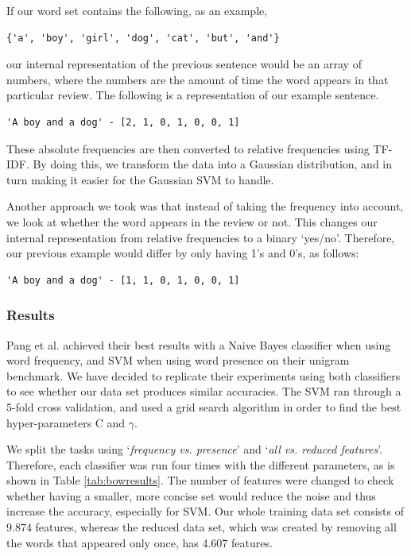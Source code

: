 \documentclass{article}
\begin{document}
If our word set contains the following, as an example,
\begin{lstlisting}
{'a', 'boy', 'girl', 'dog', 'cat', 'but', 'and'}
\end{lstlisting}

our internal representation of the previous sentence would be an array of numbers, where the numbers are the amount of time the word appears in that particular review. The following is a representation of our example sentence.

\begin{lstlisting}
'A boy and a dog' - [2, 1, 0, 1, 0, 0, 1]
\end{lstlisting}

These absolute frequencies are then converted to relative frequencies using TF-IDF. By doing this, we transform the data into a Gaussian distribution, and in turn making it easier for the Gaussian SVM to handle. 

Another approach we took was that instead of taking the frequency into account, we look at whether the word appears in the review or not. This changes our internal representation from relative frequencies to a binary `yes/no'. Therefore, our previous example would differ by only having 1's and 0's, as follows:

\begin{lstlisting}
'A boy and a dog' - [1, 1, 0, 1, 0, 0, 1]
\end{lstlisting}

\subsubsection{Results}
Pang et al. \cite{pangetal} achieved their best results with a Naive Bayes classifier when using word frequency, and SVM when using word presence on their unigram benchmark. We have decided to replicate their experiments using both classifiers to see whether our data set produces similar accuracies. The SVM ran through a 5-fold cross validation, and used a grid search algorithm in order to find the best hyper-parameters C and $\gamma$. 

We split the tasks using `\textit{frequency vs. presence}' and `\textit{all vs. reduced features}'. Therefore, each classifier was run four times with the different parameters, as is shown in Table \ref{tab:bowresults}. The number of features were changed to check whether having a smaller, more concise set would reduce the noise and thus increase the accuracy, especially for SVM. Our whole training data set consists of 9.874 features, whereas the reduced data set, which was created by removing all the words that appeared only once, has 4.607 features.
\end{document}
